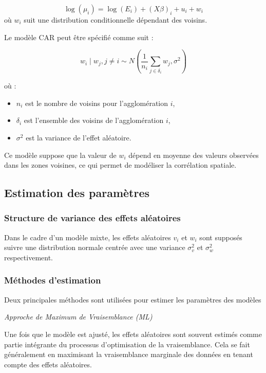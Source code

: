 \documentclass[
]{article}
\providecommand{\tightlist}{%
  \setlength{\itemsep}{0pt}\setlength{\parskip}{0pt}}
\begin{document}
\[
\log(\mu_i) = \log(E_i) + (X\beta)_i + u_i + w_i
\] où \(w_i\) suit une distribution conditionnelle dépendant des
voisins.

Le modèle CAR peut être spécifié comme suit :

\[
w_i \mid w_j, j \neq i \sim N \left( \frac{1}{n_i} \sum_{j \in \delta_i} w_j, \sigma^2 \right)
\]

où :

\begin{itemize}
\tightlist
\item
  \(n_i\) est le nombre de voisins pour l'agglomération \(i\),
\item
  \(\delta_i\) est l'ensemble des voisins de l'agglomération \(i\),
\item
  \(\sigma^2\) est la variance de l'effet aléatoire.
\end{itemize}

Ce modèle suppose que la valeur de \(w_i\) dépend en moyenne des valeurs
observées dans les zones voisines, ce qui permet de modéliser la
corrélation spatiale.

\hypertarget{estimation-des-paramuxe8tres}{%
\subsection{Estimation des
paramètres}\label{estimation-des-paramuxe8tres}}

\hypertarget{structure-de-variance-des-effets-aluxe9atoires}{%
\subsubsection{Structure de variance des effets
aléatoires}\label{structure-de-variance-des-effets-aluxe9atoires}}

Dans le cadre d'un modèle mixte, les effets aléatoires \(v_i\) et
\(w_i\) sont supposés suivre une distribution normale centrée avec une
variance \(\sigma_v^2\) et \(\sigma_w^2\) respectivement.

\hypertarget{muxe9thodes-destimation}{%
\subsubsection{Méthodes d'estimation}\label{muxe9thodes-destimation}}

Deux principales méthodes sont utilisées pour estimer les paramètres des
modèles

\emph{Approche de Maximum de Vraisemblance (ML)}

Une fois que le modèle est ajusté, les effets aléatoires sont souvent
estimés comme partie intégrante du processus d'optimisation de la
vraisemblance. Cela se fait généralement en maximisant la vraisemblance
marginale des données en tenant compte des effets aléatoires.
\end{document}
